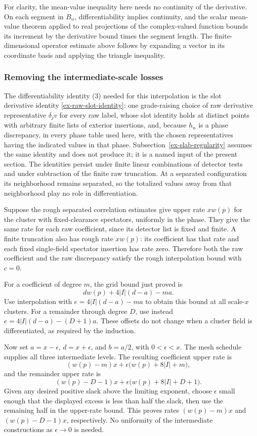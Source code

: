 For clarity, the mean-value inequality here needs no continuity of the
derivative. On each segment in $B_n$, differentiability implies
continuity, and the scalar mean-value theorem applied to real projections
of the complex-valued function bounds its increment by the derivative
bound times the segment length. The finite-dimensional operator estimate
above follows by expanding a vector in its coordinate basis and applying
the triangle inequality.

\subsubsection{Removing the intermediate-scale losses}
The differentiability identity (3) needed for this interpolation is the
slot derivative identity \eqref{ex-raw-slot-identity}: one grade-raising
choice of raw derivative representative $\delta_jv$ for every raw label,
whose slot identity holds at distinct points with arbitrary finite lists
of exterior insertions, and, because $h_n$ is a phase discrepancy, in
every phase table used here, with the chosen representatives having the
indicated values in that phase. Subsection~\ref{ex-slab-regularity} assumes
the same identity and does not produce it; it is a named input of the
present section. The identities persist under
finite linear combinations of detector tests and under subtraction of
the finite raw truncation. At a separated configuration its neighborhood
remains separated, so the totalized values away from that neighborhood
play no role in differentiation.

Suppose the rough separated correlation estimates give upper rate $xw(p)$
for the cluster with fixed-clearance spectators, uniformly in the phase.
They give the same rate for each raw coefficient, since its detector list
is fixed and finite. A finite truncation also has rough rate $xw(p)$:
its coefficient has that rate and each fixed single-field spectator
insertion has rate zero. Therefore both the raw coefficient and the raw
discrepancy satisfy the rough interpolation bound with $c=0$.

For a coefficient of degree $m$, the grid bound just proved is
\[
 dw(p)+4|I|(d-a)-ma.
\]
Use interpolation with $e=4|I|(d-a)-ma$ to obtain this bound at all
scale-$x$ clusters. For a remainder through degree $D$, use instead
$e=4|I|(d-a)-(D+1)a$. These offsets do not change when a cluster field is
differentiated, as required by the induction.

Now set $a=x-\epsilon$, $d=x+\epsilon$, and $b=a/2$, with
$0<\epsilon<x$. The mesh schedule supplies all three intermediate levels.
The resulting coefficient upper rate is
\[
 (w(p)-m)x+\epsilon\bigl(w(p)+8|I|+m\bigr),
\]
and the remainder upper rate is
\[
 (w(p)-D-1)x+\epsilon\bigl(w(p)+8|I|+D+1\bigr).
\]
Given any desired positive slack above the limiting exponent, choose
$\epsilon$ small enough that the displayed excess is less than half the
slack, then use the remaining half in the upper-rate bound. This proves
rates $(w(p)-m)x$ and $(w(p)-D-1)x$, respectively. No uniformity of the
intermediate constructions as $\epsilon\to0$ is needed.


